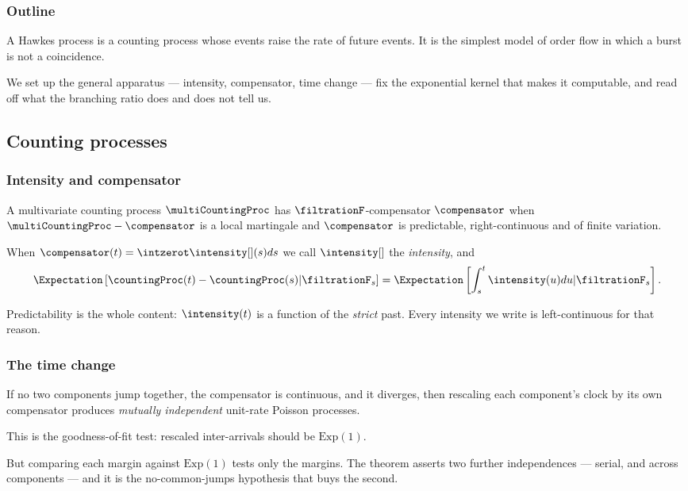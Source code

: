 \begin{frame}
  \frametitle{Outline}
\nocite{Haw71spe}
\nocite{HO74clu}
\nocite{DVJ08int}
\nocite{DZ13exa}
A Hawkes process is a counting process whose events raise the rate of future events.
It is the simplest model of order flow in which a burst is not a coincidence.

We set up the general apparatus --- intensity, compensator, time change ---
fix the exponential kernel that makes it computable,
and read off what the branching ratio does and does not tell us.
\end{frame}

\subsection{Counting processes}

\begin{frame}
  \frametitle{Intensity and compensator}
A multivariate counting process $\multiCountingProc$ has $\filtrationF$-compensator
$\compensator$ when $\multiCountingProc - \compensator$ is a local martingale
and $\compensator$ is predictable, right-continuous and of finite variation.

When $\compensator(t) = \intzerot \intensity[ ](s)ds$
we call $\intensity[ ]$ the \emph{intensity}, and
\begin{equation*}
 \Expectation\left[ \countingProc(t)-\countingProc(s) \vert \filtrationF_s \right]
 = \Expectation\left[ \int_{s}^{t} \intensity(u) du \vert \filtrationF_s \right] .
\end{equation*}

Predictability is the whole content: $\intensity(t)$ is a function of the \emph{strict} past.
Every intensity we write is left-continuous for that reason.
\end{frame}

\begin{frame}
  \frametitle{The time change}
\begin{thm}[Meyer, 1971]
 If no two components jump together, the compensator is continuous, and it diverges,
 then rescaling each component's clock by its own compensator produces
 \emph{mutually independent} unit-rate Poisson processes.
\end{thm}

This is the goodness-of-fit test: rescaled inter-arrivals should be $\text{Exp}(1)$.

But comparing each margin against $\text{Exp}(1)$ tests only the margins.
The theorem asserts two further independences --- serial, and across components ---
and it is the no-common-jumps hypothesis that buys the second.
\end{frame}

